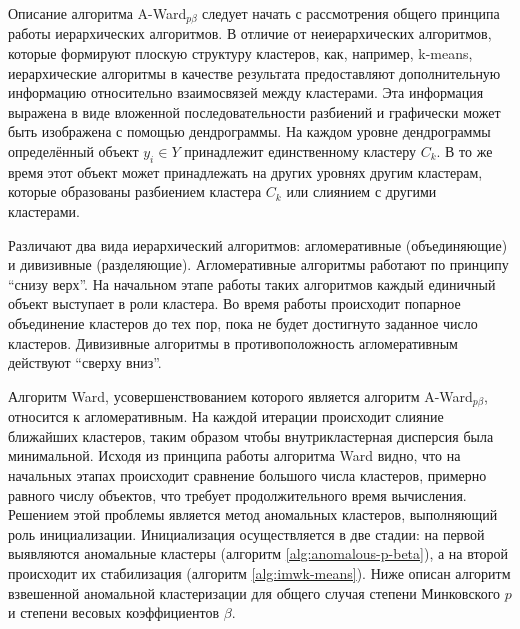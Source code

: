 \documentclass[12pt]{a&t}
\begin{document}
Описание алгоритма \mbox{A-Ward$ _{p\beta} $} следует начать с рассмотрения общего принципа работы иерархических алгоритмов. В отличие от неиерархических алгоритмов, которые формируют плоскую структуру кластеров, как, например, \mbox{k-means}, иерархические алгоритмы в качестве результата предоставляют дополнительную информацию относительно взаимосвязей между кластерами. Эта информация выражена в виде вложенной последовательности разбиений \cite{Amorim-Makarenkov-Mirkin} и графически может быть изображена с помощью дендрограммы. На каждом уровне дендрограммы определённый объект $ y_i \in Y$ принадлежит единственному кластеру $ C_k $. В то же время этот объект может принадлежать на других уровнях другим кластерам, которые образованы разбиением кластера $ C_k $ или слиянием с другими кластерами. 

Различают два вида иерархический  алгоритмов: агломеративные (объединяющие) и дивизивные (разделяющие). Агломеративные алгоритмы работают по принципу ``снизу верх''. На начальном этапе работы таких алгоритмов каждый единичный объект выступает в роли кластера. Во время работы происходит попарное объединение кластеров до тех пор, пока не будет достигнуто заданное число кластеров. Дивизивные алгоритмы в противоположность агломеративным действуют ``сверху вниз''.

Алгоритм Ward, усовершенствованием которого является алгоритм \mbox{A-Ward$ _{p\beta} $}, относится к агломеративным. На каждой итерации происходит слияние ближайших кластеров, таким образом чтобы внутрикластерная дисперсия была минимальной. Исходя из принципа работы алгоритма Ward видно, что на начальных этапах происходит сравнение большого числа кластеров, примерно равного числу объектов, что требует продолжительного время вычисления. Решением этой проблемы является метод аномальных кластеров, выполняющий роль инициализации. Инициализация осуществляется в две стадии: на первой выявляются аномальные кластеры (алгоритм \ref{alg:anomalous-p-beta}), а на второй происходит их стабилизация (алгоритм \ref{alg:imwk-means}). Ниже описан алгоритм взвешенной аномальной кластеризации для общего случая степени Минковского $ p $ и степени весовых коэффициентов $ \beta $.
\end{document}
